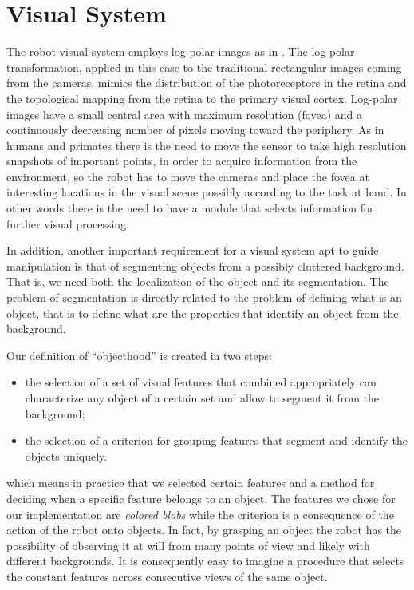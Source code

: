 \section{Visual System}
\label{sect:vision}

The robot visual system employs log-polar images as in \cite{sandini80retinalike}. The log-polar transformation, applied in this case to the traditional rectangular images coming from the cameras, mimics the distribution of the photoreceptors in the retina and the topological mapping from the retina to the primary visual cortex. Log-polar images have a small central area with maximum resolution (fovea) and a continuously decreasing number of pixels moving toward the periphery. As in humans and primates there is the need to move the sensor to take high resolution snapshots of important points, in order to acquire information from the environment, so the robot has to move the cameras and place the fovea at interesting locations in the visual scene possibly according to the task at hand. In other words there is the need to have a module that selects information for further visual processing.

In addition, another important requirement for a visual system apt to guide manipulation is that of segmenting objects from a possibly cluttered background. That is, we need both the localization of the object and its segmentation. The problem of segmentation is directly related to the problem of defining what is an object, that is to define what are the properties that identify an object from the background.

Our definition of ``objecthood'' is created in two steps:
\begin{itemize}
\item the selection of a set of visual features that combined appropriately can characterize any object of a certain set and allow to segment it from the background;
\item the selection of a criterion for grouping features that segment and identify the objects uniquely.
\end{itemize}
\noindent which means in practice that we selected certain features and a method for deciding when a specific feature belongs to an object. The features we chose for our implementation are {\em colored blobs} while the criterion is a consequence of the action of the robot onto objects. In fact, by grasping an object the robot has the possibility of observing it at will from many points of view and likely with different backgrounds. It is consequently easy to imagine a procedure that selects the constant features across consecutive views of the same object.


